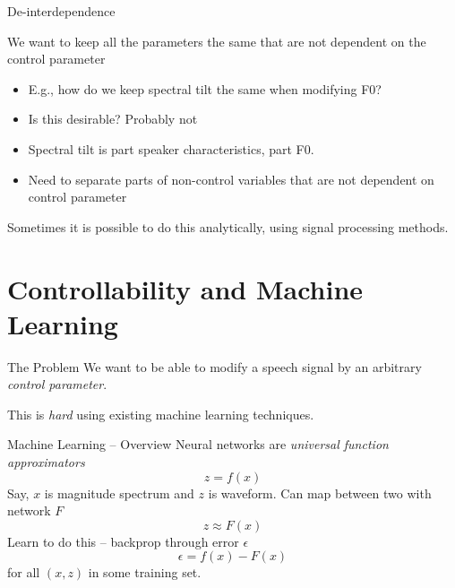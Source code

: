 \documentclass[10pt]{beamer}
\begin{document}
\begin{frame}{De-interdependence}

We want to keep all the parameters the same that are not dependent on the control parameter
\begin{itemize}
    \item E.g., how do we keep spectral tilt the same when modifying F0?
    \item Is this desirable? Probably not
    \item Spectral tilt is part speaker characteristics, part F0.
    \item Need to separate parts of non-control variables that are not dependent on control parameter
\end{itemize}{}
Sometimes it is possible to do this analytically, using signal processing methods.
\end{frame}{}

\section{Controllability and Machine Learning}
\begin{frame}[fragile]{The Problem}
We want to be able to modify a speech signal by an arbitrary \emph{control parameter}.

This is \emph{hard} using existing machine learning techniques.



\end{frame}

\begin{frame}{Machine Learning -- Overview}
    Neural networks are \emph{universal function approximators}
    \begin{equation}
        z = f(x)
    \end{equation}
    Say, $x$ is magnitude spectrum and $z$ is waveform.
    Can map between two with network $F$
    \begin{equation}
        z \approx F(x)
    \end{equation}
    Learn to do this -- backprop through error $\epsilon$
    \begin{equation}
        \epsilon = f(x) - F(x)
    \end{equation}
    for all $(x,z)$ in some training set.
\end{frame}
\end{document}
